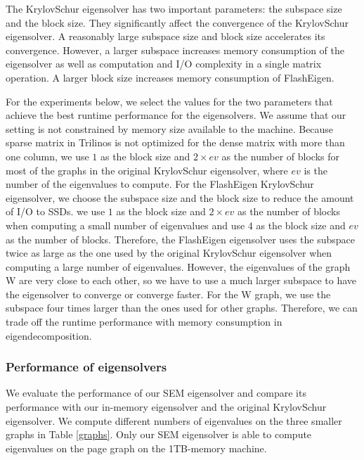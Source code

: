 The KrylovSchur eigensolver has two important parameters: the subspace size
and the block size. They significantly affect the convergence of
the KrylovSchur eigensolver. A reasonably large subspace size and block size
accelerates its convergence. However, a larger subspace increases memory
consumption of the eigensolver as well as computation and I/O complexity
in a single matrix operation. A larger block size increases memory consumption
of FlashEigen.

For the experiments below, we select the values for the two parameters that
achieve the best runtime performance for the eigensolvers. We assume that
our setting is not constrained by memory size available to the machine.
Because sparse matrix in Trilinos is not optimized for
the dense matrix with more than one column, we use $1$ as the block size and
$2 \times ev$ as the number of blocks for most of the graphs in the original
KrylovSchur eigensolver, where $ev$ is the number of the eigenvalues to compute.
For the FlashEigen KrylovSchur eigensolver, we choose the subspace size and
the block size to reduce the amount of I/O to SSDs. we use $1$ as the block size and
$2 \times ev$ as the number of blocks when computing a small number of eigenvalues
and use $4$ as the block size and $ev$ as the number of blocks. Therefore,
the FlashEigen eigensolver uses the subspace twice as large as the one used by
the original KrylovSchur eigensolver when computing a large number of eigenvalues.
However, the eigenvalues of the graph W are very close to each other, so we have
to use a much larger subspace to have the eigensolver to converge or converge
faster. For the W graph, we use the subspace four times larger than the ones
used for other graphs. Therefore, we can trade off the runtime performance
with memory consumption in eigendecomposition.

\subsubsection{Performance of eigensolvers}

We evaluate the performance of our SEM eigensolver and compare its performance
with our in-memory eigensolver and the original KrylovSchur eigensolver.
We compute different numbers of eigenvalues on the three smaller graphs in
Table \ref{graphs}. Only our SEM eigensolver is able to compute eigenvalues
on the page graph on the 1TB-memory machine.

